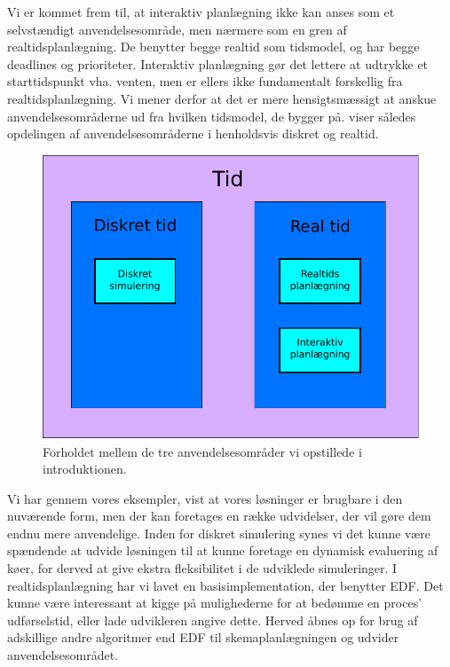 Vi er kommet frem til, at interaktiv planlægning ikke kan anses som et selvstændigt anvendelsesområde, men nærmere som en gren af realtidsplanlægning. De benytter begge realtid som tidsmodel, og har begge deadlines og prioriteter. Interaktiv planlægning gør det lettere at udtrykke et starttidspunkt vha. venten, men er ellers ikke fundamentalt forskellig fra realtidsplanlægning. Vi mener derfor at det er mere hensigtsmæssigt at anskue anvendelsesområderne ud fra hvilken tidsmodel, de bygger på.  viser således opdelingen af anvendelsesområderne i henholdsvis diskret og realtid.

\begin{figure}[htp]
 \begin{center}
  \includegraphics[scale=0.6]{images/timemodel}
	\caption{Forholdet mellem de tre anvendelsesområder vi opstillede i introduktionen.}
	\label{fig:timemodel}
\end{center}
\end{figure}


Vi har gennem vores eksempler, vist at vores løsninger er brugbare i den nuværende form, men der kan foretages en række udvidelser, der vil gøre dem endnu mere anvendelige. 
Inden for diskret simulering synes vi det kunne være spændende at udvide løsningen til at kunne foretage en dynamisk evaluering af køer, for derved at give ekstra fleksibilitet i de udviklede simuleringer. I realtidsplanlægning har vi lavet en basisimplementation, der benytter EDF. Det kunne være interessant at kigge på mulighederne for at bedømme en proces' udførselstid, eller lade udvikleren angive dette. Herved åbnes op for brug af adskillige andre algoritmer end EDF til skemaplanlægningen og udvider anvendelsesområdet.  







